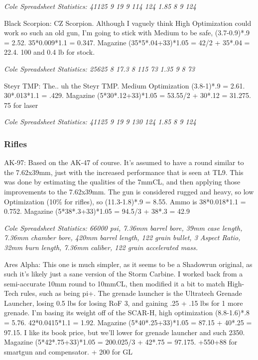 \begin{multicols*}{2}
	\textit{\textcolor{OliveGreen}{Cole Spreadsheet Statistics: 41125 9 19 9 114 124 1.85 8 9 124}}
	
	Black Scorpion: CZ Scorpion. Although I vaguely think High Optimization could work so such an old gun, I'm going to stick with Medium to be safe, (3.7-0.9)*.9 = 2.52. 35*0.009*1.1 = 0.347. Magazine (35*5*.04+33)*1.05 = 42/2 + 35*.04 = 22.4. 100 and 0.4 lb for stock.
	
	\textit{\textcolor{OliveGreen}{Cole Spreadsheet Statistics: 25625 8 17.3 8 115 73 1.35 9 8 73}}
	
	Steyr TMP: The.. uh the Steyr TMP. Medium Optimization (3.8-1)*.9 = 2.61. 30*.013*1.1 = .429. Magazine (5*30*.12+33)*1.05 = 53.55/2 + 30*.12 = 31.275. 75 for laser
	
	\textit{\textcolor{OliveGreen}{Cole Spreadsheet Statistics: 41125 9 19 9 130 124 1.85 8 9 124}}
	
	\subsubsection{Rifles}
	
	AK-97: Based on the AK-47 of course. It's assumed to have a round similar to the 7.62x39mm, just with the increased performance that is seen at TL9. This was done by estimating the qualities of the 7mmCL, and then applying those improvements to the 7.62x39mm. The gun is considered rugged and heavy, so low Optimization (10\% for rifles), so (11.3-1.8)*.9 = 8.55. Ammo is 38*0.018*1.1 = 0.752. Magazine (5*38*.3+33)*1.05 = 94.5/3 + 38*.3 = 42.9
	
	\textit{\textcolor{OliveGreen}{Cole Spreadsheet Statistics: 66000 psi, 7.36mm barrel bore, 39mm case length, 7.36mm chamber bore, 420mm barrel length, 122 grain bullet, 3 Aspect Ratio, 32mm burn length, 7.36mm caliber, 122 grain accelerated mass.}}
	
	Ares Alpha: This one is much simpler, as it seems to be a Shadowrun original, as such it's likely just a sane version of the Storm Carbine. I worked back from a semi-accurate 10mm round to 10mmCL, then modified it a bit to match High-Tech rules, such as being pi+. The grenade launcher is the Ultratech Grenade Launcher, losing 0.5 lbs for losing RoF 3, and gaining .25 + .15 lbs for 1 more grenade. I'm basing its weight off of the SCAR-H, high optimization (8.8-1.6)*.8 = 5.76. 42*0.0415*1.1 = 1.92. Magazine (5*40*.25+33)*1.05 = 87.15 + 40*.25 = 97.15. I like its book price, but we'll lower for grenade launcher and such 2350. Magazine (5*42*.75+33)*1.05 = 200.025/3 + 42*.75 = 97.175. +550+88 for smartgun and compensator. + 200 for GL
	

\end{multicols*}
